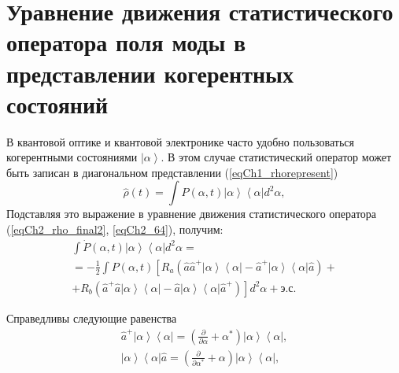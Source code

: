 \section{Уравнение движения статистического оператора поля моды в
  представлении когерентных состояний}
В квантовой оптике и квантовой электронике часто удобно пользоваться
когерентными состояниями $\left|\alpha\right>$.  В этом случае
статистический оператор может быть записан в диагональном
представлении (\ref{eqCh1_rhorepresent})  
\begin{equation}
\hat{\rho}\left(t\right) = \int
P\left(\alpha, t\right)\left|\alpha\right>\left<\alpha\right| d^2 \alpha,
\label{eqCh2_65}
\end{equation}
Подставляя это выражение в уравнение движения статистического
оператора (\ref{eqCh2_rho_final2}, \ref{eqCh2_64}), получим: 
\begin{eqnarray}
\int \dot{P}\left(\alpha, t\right)\left|\alpha\right>\left<\alpha\right|
d^2 \alpha  = 
\nonumber \\
= -\frac{1}{2}\int P\left(\alpha, t\right)\left[R_a
\left(\hat{a}\hat{a}^{+}\left|\alpha\right>\left<\alpha\right|-\hat{a}^{+}\left|\alpha\right>\left<\alpha\right|\hat{a}\right)
\right. +
\nonumber \\
+
\left.
R_b
\left(\hat{a}^{+}\hat{a}\left|\alpha\right>\left<\alpha\right|-\hat{a}\left|\alpha\right>\left<\alpha\right|\hat{a}^{+}\right)
\right]d^2 \alpha +\mbox{э.с.}
\label{eqCh2_66}
\end{eqnarray}

Справедливы следующие равенства
\begin{eqnarray}
\hat{a}^{+}\left|\alpha\right>\left<\alpha\right| = 
\left(\frac{\partial}{\partial \alpha} +
\alpha^{*}\right)\left|\alpha\right>\left<\alpha\right|, 
\nonumber \\
\left|\alpha\right>\left<\alpha\right|\hat{a} = 
\left(\frac{\partial}{\partial \alpha^{*}} +
\alpha\right)\left|\alpha\right>\left<\alpha\right|, 
\label{eqCh2_67}
\end{eqnarray}

